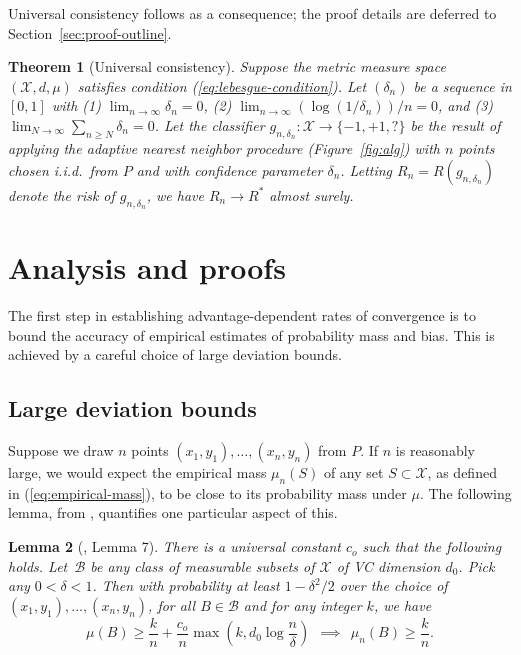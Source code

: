 \documentclass{article}
\def\X{{\mathcal X}}
\def\B{{\mathcal B}}
\newtheorem{theorem}{Theorem}
\newtheorem{lemma}[theorem]{Lemma}
\begin{document}
Universal consistency follows as a consequence; the proof details are deferred to Section~\ref{sec:proof-outline}.
\begin{theorem}[Universal consistency]
Suppose the metric measure space $(\X, d, \mu)$ satisfies condition (\ref{eq:lebesgue-condition}). Let $(\delta_n)$ be a sequence in $[0,1]$ with (1) $\lim_{n \rightarrow \infty} \delta_n = 0$, (2) $\lim_{n \rightarrow \infty} (\log (1/\delta_n))/n = 0$, and (3) $\lim_{N \rightarrow \infty} \sum_{n \geq N} \delta_n = 0$. Let the classifier $g_{n, \delta_n}: \X \rightarrow \{-1,+1,?\}$ be the result of applying the adaptive nearest neighbor procedure (Figure~\ref{fig:alg}) with $n$ points chosen i.i.d.\ from $P$ and with confidence parameter $\delta_n$. Letting $R_n = R(g_{n,\delta_n})$ denote the risk of $g_{n,\delta_n}$, we have $R_n \rightarrow R^*$ almost surely.
\label{thm:universal-consistency}
\end{theorem}

\section{Analysis and proofs}\label{sec:gen3}
\label{sec:proof-outline}

The first step in establishing advantage-dependent rates of convergence is to bound the accuracy of empirical estimates of probability mass and bias. This is achieved by a careful choice of large deviation bounds.

\subsection{Large deviation bounds}

Suppose we draw $n$ points $(x_1, y_1), \ldots, (x_n, y_n)$ from $P$. If $n$ is reasonably large, we would expect the empirical mass $\mu_n(S)$ of any set $S \subset \X$, as defined in (\ref{eq:empirical-mass}), to be close to its probability mass under $\mu$. The following lemma, from \cite{ChaudhuriDasgupta2010}, quantifies one particular aspect of this.
\begin{lemma}[\cite{ChaudhuriDasgupta2010}, Lemma 7]
There is a universal constant $c_o$ such that the following holds. Let~$\B$ be any class of measurable subsets of $\X$ of VC dimension $d_0$. Pick any $0 < \delta < 1$. Then with probability at least $1-\delta^2/2$ over the choice of $(x_1, y_1), \ldots, (x_n, y_n)$, for all $B \in \B$ and for any integer $k$, we have
$$ \mu(B) \geq \frac{k}{n} + \frac{c_o}{n} \max \left( k, d_0 \log \frac{n}{\delta} \right)
\ \ \implies \ \ 
\mu_{n}(B) \geq \frac{k}{n} .$$
\label{lemma:points-in-balls}
\end{lemma}
\end{document}
